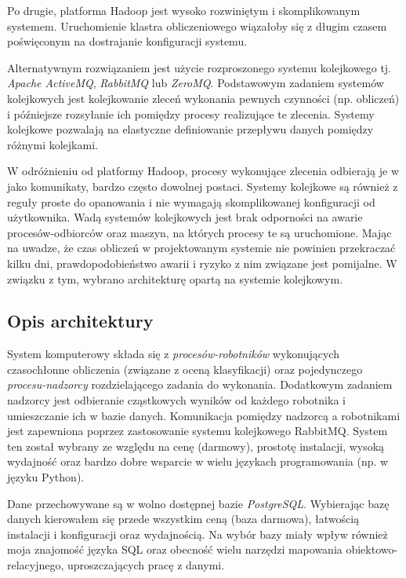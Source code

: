 \documentclass[../thesis.tex]{subfiles}
\begin{document}
Po drugie, platforma Hadoop jest wysoko rozwiniętym i skomplikowanym systemem. Uruchomienie klastra obliczeniowego wiązałoby się z długim czasem poświęconym na dostrajanie konfiguracji systemu.

Alternatywnym rozwiązaniem jest użycie rozproszonego systemu kolejkowego tj. \emph{Apache ActiveMQ}, \emph{RabbitMQ} lub \emph{ZeroMQ}. Podstawowym zadaniem systemów kolejkowych jest kolejkowanie zleceń wykonania pewnych czynności (np. obliczeń) i późniejsze rozsyłanie ich pomiędzy procesy realizujące te zlecenia. Systemy kolejkowe pozwalają na elastyczne definiowanie przepływu danych pomiędzy różnymi kolejkami. 

W odróżnieniu od platformy Hadoop, procesy wykonujące zlecenia odbierają je w jako komunikaty, bardzo często dowolnej postaci. Systemy kolejkowe są również z reguły proste do opanowania i nie wymagają skomplikowanej konfiguracji od użytkownika. Wadą systemów kolejkowych jest brak odporności na awarie procesów-odbiorców oraz maszyn, na których procesy te są uruchomione. Mając na uwadze, że czas obliczeń w projektowanym systemie nie powinien przekraczać kilku dni, prawdopodobieństwo awarii i ryzyko z nim związane jest pomijalne. W związku z tym, wybrano architekturę opartą na systemie kolejkowym.

\subsection{Opis architektury}

System komputerowy składa się z \emph{procesów-robotników} wykonujących czasochłonne obliczenia (związane z oceną klasyfikacji) oraz pojedynczego \emph{procesu-nadzorcy} rozdzielającego zadania do wykonania. Dodatkowym zadaniem nadzorcy jest odbieranie cząstkowych wyników od każdego robotnika i umieszczanie ich w bazie danych. Komunikacja pomiędzy nadzorcą a robotnikami jest zapewniona poprzez zastosowanie systemu kolejkowego RabbitMQ. System ten został wybrany ze względu na cenę (darmowy), prostotę instalacji, wysoką wydajność oraz bardzo dobre wsparcie w wielu językach programowania (np. w języku Python).

Dane przechowywane są w wolno dostępnej bazie \emph{PostgreSQL}. Wybierając bazę danych kierowałem się przede wszystkim ceną (baza darmowa), łatwością instalacji i konfiguracji oraz wydajnością. Na wybór bazy miały wpływ również moja znajomość języka SQL oraz obecność wielu narzędzi mapowania obiektowo-relacyjnego, uproszczających pracę z danymi. 
\end{document}
